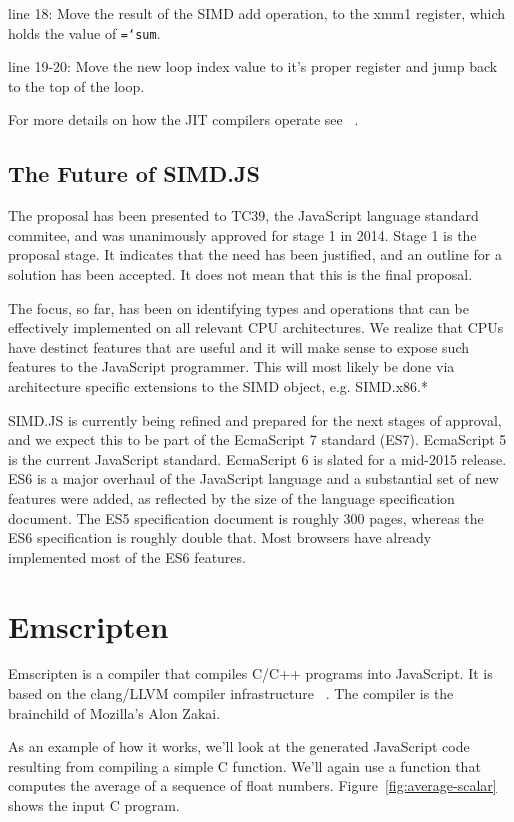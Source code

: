 \documentclass[preprint]{sigplanconf}
\newcommand{\ttt}[1]{{\texttt{\hyphenchar\font=`\-\relax #1}}}%
\begin{document}
line 18: Move the result of the SIMD add operation, to the xmm1 register, which
holds the value of \ttt{sum}.

line 19-20: Move the new loop index value to it's proper register and jump back
to the top of the loop.

For more details on how the JIT compilers operate see ~\cite{wpmvp2014}.

\subsection{The Future of SIMD.JS}

The proposal has been presented to TC39, the JavaScript language standard
commitee, and was unanimously approved for stage 1 in 2014.  Stage 1 is the
proposal stage.  It indicates that the need has been justified, and an 
outline for a solution has been accepted.  It does not mean that this is the final
proposal.

The focus, so far, has been on identifying types and operations that can be
effectively implemented on all relevant CPU architectures.  We realize that CPUs
have destinct features that are useful and it will make sense to expose such 
features to the JavaScript programmer.  This will most likely be done via
architecture specific extensions to the SIMD object, e.g. SIMD.x86.*

SIMD.JS is currently being refined and prepared for the next stages of approval,
and we expect this to be part of the EcmaScript 7 standard (ES7).
EcmaScript 5 is the current JavaScript standard.  EcmaScript 6 is slated for a
mid-2015 release. ES6 is a major overhaul of the JavaScript language and a 
substantial set of new features were added, as reflected by the size of the 
language specification document.  The ES5 specification document is roughly 300 
pages, whereas the ES6 specification is roughly double that. Most browsers 
have already implemented most of the ES6 features.

\section{Emscripten}

Emscripten is a compiler that compiles C/C++ programs into JavaScript.  It is
based on the clang/LLVM compiler infrastructure ~\cite{emscripten}.  The compiler
is the brainchild of Mozilla's Alon Zakai.

As an example of how it works, we'll look at the generated JavaScript code
resulting from compiling a simple C function.  We'll again use a function that
computes the average of a sequence of float numbers.  Figure~\ref{fig:average-scalar} shows
the input C program.
\end{document}
